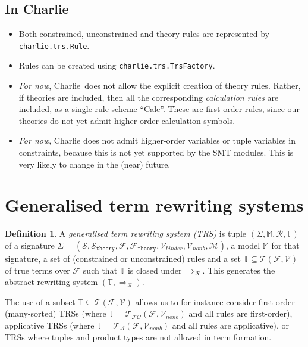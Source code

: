 \documentclass{lmcs}
\theoremstyle{theorem}\newtheorem{theorem}{Theorem}
\theoremstyle{theorem}\newtheorem{lemma}[theorem]{Lemma}
\theoremstyle{theorem}\newtheorem{corollary}[theorem]{Corollary}
\theoremstyle{definition}\newtheorem{definition}[theorem]{Definition}
\theoremstyle{definition}\newtheorem{example}[theorem]{Example}
\newcommand{\F}{\mathcal{F}}
\newcommand{\thF}{\mathcal{F}_{\mathtt{theory}}}
\newcommand{\V}{\mathcal{V}}
\newcommand{\M}{\mathcal{M}}
\newcommand{\MM}{\mathbb{M}}
\newcommand{\Vfree}{\mathcal{V}_{\mathit{nonb}}}
\newcommand{\Vbound}{\mathcal{V}_{\mathit{binder}}}
\newcommand{\Sorts}{\mathcal{S}}
\newcommand{\thSorts}{\mathcal{S}_{\mathtt{theory}}}
\newcommand{\Terms}{\mathcal{T}}
\newcommand{\ATerms}{\mathcal{T}_{\mathcal{A}}}
\newcommand{\FOTerms}{\mathcal{T}_{\mathcal{FO}}}
\newcommand{\Rules}{\mathcal{R}}
\newcommand{\termsset}{\mathbb{T}}
\newcommand{\arrz}{\Rightarrow}
\newcommand{\arr}[1]{\arrz_{#1}}
\newcommand{\charlie}{\textsf{Charlie}\xspace}
\begin{document}
\subsection*{In \charlie}

\begin{itemize}
\item Both constrained, unconstrained and theory rules are represented by
  \texttt{charlie.trs.Rule}.
\item Rules can be created using \texttt{charlie.trs.TrsFactory}.
\item \emph{For now}, \charlie\ does not allow the explicit creation of theory
  rules.  Rather, if theories are included, then all the corresponding
  \emph{calculation rules} are included, as a single rule scheme
  ``Calc''.  These are first-order rules, since our theories do not yet admit
  higher-order calculation symbols.
\item \emph{For now}, \charlie does not admit higher-order variables or tuple
  variables in constraints, because this is not yet supported by the SMT
  modules.  This is very likely to change in the (near) future.
\end{itemize}

\section{Generalised term rewriting systems}\label{sec:trs}

\begin{definition}
A \emph{generalised term rewriting system (TRS)} is tuple $(\Sigma,\MM,\Rules,
\termsset)$ of a signature $\Sigma = (\Sorts,\thSorts,\F,\thF,\Vbound,\Vfree,
\M)$, a model $\MM$ for that signature, a set of (constrained or unconstrained)
rules and a set $\termsset \subseteq \Terms(\F,\V)$ of true terms over $\F$
such that $\termsset$ is closed under $\arr{\Rules}$.
This generates the abstract rewriting system $(\termsset,\arr{\Rules})$.
\end{definition}

The use of a subset $\termsset \subseteq \Terms(\F,\V)$ allows us to for
instance consider first-order (many-sorted) TRSs (where $\termsset =
\FOTerms(\F,\Vfree)$ and all rules are first-order), applicative TRSs (where
$\termsset = \ATerms(\F,\Vfree)$ and all rules are applicative), or TRSs where
tuples and product types are not allowed in term formation.
\end{document}
